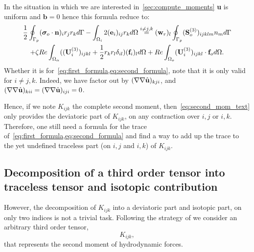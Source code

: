 In the situation in which we are interested in~\ref{sec:compute_moments} \textbf{u} is uniform and $\textbf{b}=0$ hence this formula reduce to: 
\begin{multline}
    \frac{1}{2}\intS[p]{  (\bm\sigma_{o}\cdot \textbf{n})_i r_jr_k}
    - \intO[i]{2(\textbf{e}_i )_{ij} r_k}
    \overset{i\neq j,k}{=}
    (\textbf{w}_{r})_l \intS[p]{ (\textbf{S}^{(3)}_{o})_{ijklm} n_m}
    \\
    + \zeta Re \intO{((\textbf{U}^{(3)}_{i})_{ijkl} + \frac{1}{2}r_kr_l\delta_{il}) (\textbf{f}_{i})_l} 
    + Re\intO[o]{(\textbf{U}^{(3)}_{i})_{ijkl}\cdot \textbf{f}_{o}}.
    \label{eq:second_formula}
\end{multline}
Whether it is for~\ref{eq:first_formula,eq:second_formula}, note that it is only valid for $i\neq j,k$. 
Indeed, we have factor out by $(\mathbf{\nabla}\mathbf{\nabla}\hat{\textbf{u}})_{kji}$, and $(\mathbf{\nabla}\mathbf{\nabla}\hat{\textbf{u}})_{kii} = (\mathbf{\nabla}\mathbf{\nabla}\hat{\textbf{u}})_{iji} = 0$. 

Hence, if we note $K_{ijk}$ the complete second moment, then~\ref{eq:second_mom_text} only provides the deviatoric part of $K_{ijk}$, on any contraction over $i,j$ or $i,k$. 
Therefore, one still need a formula for the trace of~\ref{eq:first_formula,eq:second_formula} and find a way to add up the trace to the yet undefined traceless part (on $i,j$ and $i,k$) of $K_{ijk}$.  


\subsection{Decomposition of a third order tensor into traceless tensor and isotopic contribution}

However, the decomposition of $K_{ijk}$ into a deviatoric part and isotopic part, on only two indices is not a trivial task. 
Following the strategy of \citet{nadim1991motion} we consider an arbitrary third order tensor,
\begin{equation}
    K_{ijk},
\end{equation}
that represents the second moment of hydrodynamic forces. 


